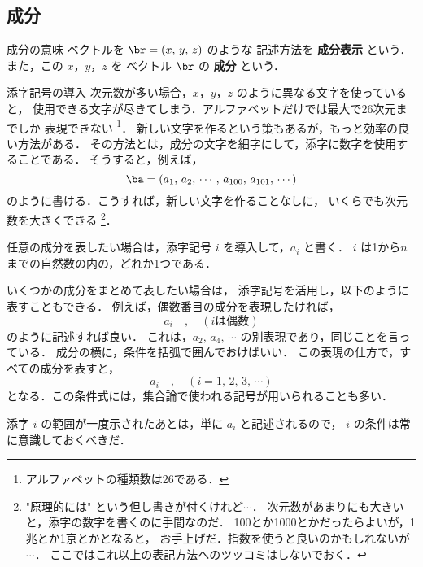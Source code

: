         \subsection{成分}
        \begin{mysmallsec}{成分の意味}
        ベクトルを $\br = (x,\,y,\,z)$ のような
        記述方法を \textbf{成分表示} という．
        また，この $x$，$y$，$z$ を
        ベクトル $\br$ の \textbf{成分} という．
        \end{mysmallsec}

        \begin{mysmallsec}{添字記号の導入}
        次元数が多い場合，$x$，$y$，$z$ のように異なる文字を使っていると，
        使用できる文字が尽きてしまう．アルファベットだけでは最大で26次元までしか
        表現できない
            \footnote{
                アルファベットの種類数は26である．
            }．
        新しい文字を作るという策もあるが，もっと効率の良い方法がある．
        その方法とは，成分の文字を細字にして，添字に数字を使用することである．
        そうすると，例えば，
            \begin{equation*}
                \ba = (a_{1},\,a_{2},\,\cdots,\,a_{100},\,a_{101},\,\cdots)
            \end{equation*}
        のように書ける．こうすれば，新しい文字を作ることなしに，
        いくらでも次元数を大きくできる
            \footnote{
                "原理的には" という但し書きが付くけれど$\cdots$．
                次元数があまりにも大きいと，添字の数字を書くのに手間なのだ．
                100とか1000とかだったらよいが，1兆とか1京とかとなると，
                お手上げだ．指数を使うと良いのかもしれないが$\cdots$．
                ここではこれ以上の表記方法へのツッコミはしないでおく．
            }．

        任意の成分を表したい場合は，添字記号 $i$ を導入して，$a_{i}$ と書く．
        $i$ は1から$n$ までの自然数の内の，どれか1つである．

        いくつかの成分をまとめて表したい場合は，
        添字記号を活用し，以下のように表すこともできる．
        例えば，偶数番目の成分を表現したければ，
            \begin{equation*}
                a_{i} \quad,\quad (i\mbox{は偶数})
            \end{equation*}
        のように記述すれば良い．
        これは，$a_{2},\,a_{4},\,\cdots$ の別表現であり，同じことを言っている．
        成分の横に，条件を括弧で囲んでおけばいい．
        この表現の仕方で，すべての成分を表すと，
            \begin{equation*}
                a_{i} \quad,\quad (i=1,\,2,\,3,\,\cdots)
            \end{equation*}
        となる．この条件式には，集合論で使われる記号が用いられることも多い．

        添字 $i$ の範囲が一度示されたあとは，単に $a_{i}$ と記述されるので，
        $i$ の条件は常に意識しておくべきだ．
        \end{mysmallsec}

